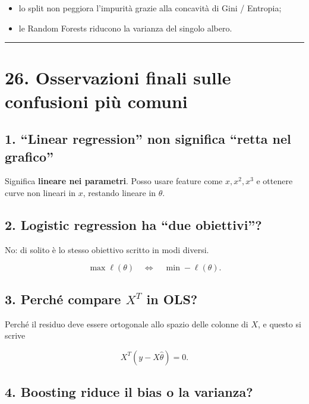 \documentclass[
]{article}
\providecommand{\tightlist}{%
  \setlength{\itemsep}{0pt}\setlength{\parskip}{0pt}}
\begin{document}
\begin{itemize}
\tightlist
\item
  lo split non peggiora l'impurità grazie alla concavità di Gini /
  Entropia;
\item
  le Random Forests riducono la varianza del singolo albero.
\end{itemize}

\begin{center}\rule{0.5\linewidth}{0.5pt}\end{center}

\section{26. Osservazioni finali sulle confusioni più
comuni}\label{osservazioni-finali-sulle-confusioni-piuxf9-comuni}

\subsection{1. ``Linear regression'' non significa ``retta nel
grafico''}\label{linear-regression-non-significa-retta-nel-grafico}

Significa \textbf{lineare nei parametri}. Posso usare feature come
\(x, x^2, x^3\) e ottenere curve non lineari in \(x\), restando lineare
in \(\theta\).

\subsection{2. Logistic regression ha ``due
obiettivi''?}\label{logistic-regression-ha-due-obiettivi}

No: di solito è lo stesso obiettivo scritto in modi diversi.

\[
\max \ell(\theta)
\quad\Longleftrightarrow\quad
\min -\ell(\theta).
\]

\subsection{\texorpdfstring{3. Perché compare \(X^T\) in
OLS?}{3. Perché compare X\^{}T in OLS?}}\label{perchuxe9-compare-xt-in-ols}

Perché il residuo deve essere ortogonale allo spazio delle colonne di
\(X\), e questo si scrive

\[
X^T(y-X\hat\theta)=0.
\]

\subsection{4. Boosting riduce il bias o la
varianza?}\label{boosting-riduce-il-bias-o-la-varianza}
\end{document}
